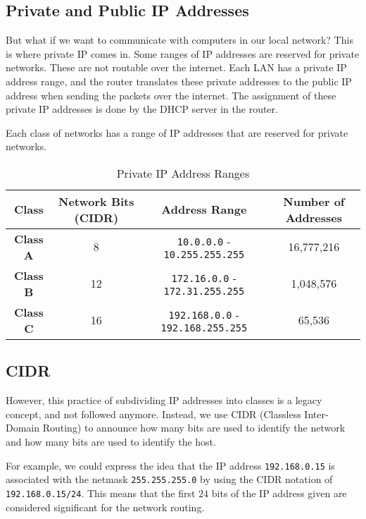 \subsection{Private and Public IP Addresses}

But what if we want to communicate with computers
in our local network? This is where private IP
comes in. Some ranges of IP addresses are reserved
for private networks. These are not routable over
the internet. Each LAN has a private IP address
range, and the router translates these private
addresses to the public IP address when sending
the packets over the internet. The assignment
of these private IP addresses is done by the
DHCP server
in the router.

Each class of networks has a range of IP addresses
that are reserved for private networks.

\begin{table*}[h!]
\caption{Private IP Address Ranges}
\begin{tabular}{c c c c}
\toprule
Class & Network Bits (CIDR) & Address Range & Number of Addresses \\
\midrule
\textbf{Class A} & 8 & \texttt{10.0.0.0} - \texttt{10.255.255.255} & 16,777,216 \\
\textbf{Class B} & 12 & \texttt{172.16.0.0} - \texttt{172.31.255.255} & 1,048,576 \\
\textbf{Class C} & 16 & \texttt{192.168.0.0} - \texttt{192.168.255.255} & 65,536 \\
\bottomrule
\end{tabular}
\end{table*}

\subsection{CIDR}

However, this practice of subdividing IP addresses
into classes is a legacy concept, and not followed
anymore. Instead, we use CIDR (Classless Inter-Domain
Routing) to announce how many bits are used to identify
the network and how many bits are used to identify the
host.

For example, we could express the idea that the IP address
\texttt{192.168.0.15} is associated with the netmask
\texttt{255.255.255.0} by using the CIDR notation of
\texttt{192.168.0.15/24}. This means that the first
$24$ bits of the IP address given are considered
significant for the network routing.

